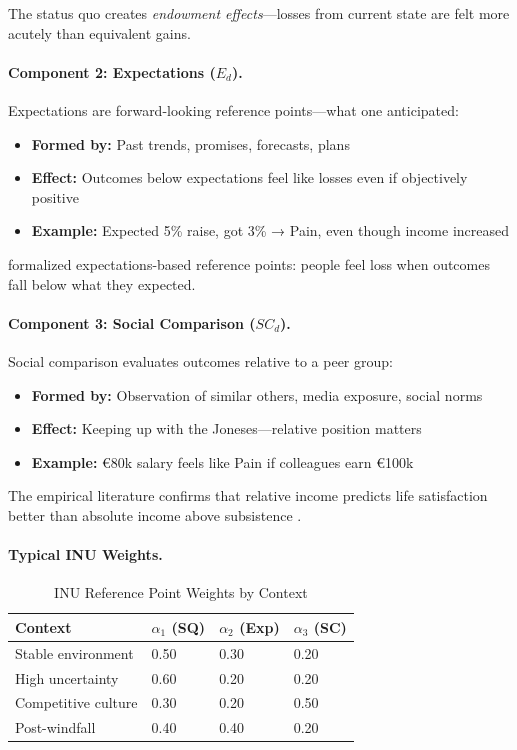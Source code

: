 The status quo creates \emph{endowment effects}---losses from current state 
are felt more acutely than equivalent gains.

\paragraph{Component 2: Expectations ($E_d$).}
Expectations are forward-looking reference points---what one anticipated:

\begin{itemize}
\item \textbf{Formed by:} Past trends, promises, forecasts, plans
\item \textbf{Effect:} Outcomes below expectations feel like losses even if 
objectively positive
\item \textbf{Example:} Expected 5\% raise, got 3\% → Pain, even though income increased
\end{itemize}

\citet{PAP-koszegi2006model} formalized expectations-based reference points:
people feel loss when outcomes fall below what they expected.

\paragraph{Component 3: Social Comparison ($SC_d$).}
Social comparison evaluates outcomes relative to a peer group:

\begin{itemize}
\item \textbf{Formed by:} Observation of similar others, media exposure, social norms
\item \textbf{Effect:} Keeping up with the Joneses---relative position matters
\item \textbf{Example:} \euro{80k} salary feels like Pain if colleagues earn \euro{100k}
\end{itemize}

The empirical literature confirms that relative income predicts life satisfaction 
better than absolute income above subsistence \citep{clark2008relative}.

\paragraph{Typical INU Weights.}

\begin{table}[htbp]
\centering
\caption{INU Reference Point Weights by Context}
\label{tab:inu-weights}
\renewcommand{\arraystretch}{1.3}
\begin{tabular}{@{}llll@{}}
\toprule
\textbf{Context} & $\alpha_1$ (SQ) & $\alpha_2$ (Exp) & $\alpha_3$ (SC) \\
\midrule
Stable environment & 0.50 & 0.30 & 0.20 \\
High uncertainty & 0.60 & 0.20 & 0.20 \\
Competitive culture & 0.30 & 0.20 & 0.50 \\
Post-windfall & 0.40 & 0.40 & 0.20 \\
\bottomrule
\end{tabular}
\end{table}

